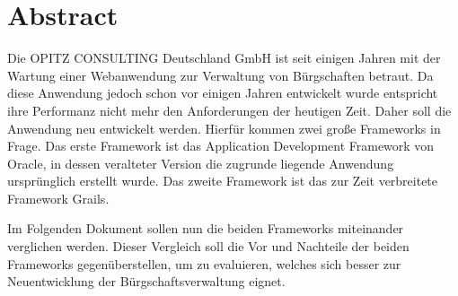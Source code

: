 \section*{Abstract}
Die OPITZ CONSULTING Deutschland GmbH ist seit einigen Jahren mit der Wartung einer Webanwendung zur Verwaltung von Bürgschaften betraut. Da diese Anwendung jedoch schon vor einigen Jahren entwickelt wurde entspricht ihre Performanz nicht mehr den Anforderungen der heutigen Zeit. Daher soll die Anwendung neu entwickelt werden. Hierfür kommen zwei große Frameworks in Frage. Das erste Framework ist das Application Development Framework von Oracle, in dessen veralteter Version  die zugrunde liegende Anwendung ursprünglich erstellt wurde. Das zweite Framework ist das zur Zeit verbreitete Framework Grails.

Im Folgenden Dokument sollen nun die beiden Frameworks miteinander verglichen werden. Dieser Vergleich soll die Vor und Nachteile der beiden Frameworks gegenüberstellen, um zu evaluieren, welches sich besser zur Neuentwicklung der Bürgschaftsverwaltung eignet.